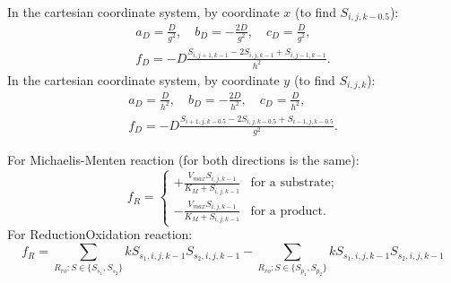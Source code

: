 \documentclass[a4paper,10pt]{article}
\begin{document}
In the cartesian coordinate system, by coordinate $x$ (to find $S_{i,j,k-0.5}$):
\begin{multline}
    a_D = \frac{D}{g^2},\quad
    b_D = -\frac{2 D}{g^2},\quad
    c_D = \frac{D}{g^2},\\
    f_D = - D \frac{S_{i,j+1,k-1} - 2 S_{i,j,k-1} + S_{i,j-1,k-1}}{h^2}.
\end{multline}
In the cartesian coordinate system, by coordinate $y$ (to find $S_{i,j,k}$):
\begin{multline}
    a_D = \frac{D}{h^2},\quad
    b_D = -\frac{2 D}{h^2},\quad
    c_D = \frac{D}{h^2},\\
    f_D = - D \frac{S_{i+1,j,k-0.5} - 2 S_{i,j,k-0.5} + S_{i-1,j,k-0.5}}{g^2}.
\end{multline}

For Michaelis-Menten reaction (for both directions is the same):
\begin{equation}
    f_R =
        \begin{cases}
            +\frac{V_{max} S_{i,j,k-1}}{K_M + S_{i,j,k-1}} &\text{for a substrate};\\
            -\frac{V_{max} S_{i,j,k-1}}{K_M + S_{i,j,k-1}} &\text{for a product}.
        \end{cases}
\end{equation}
For ReductionOxidation reaction:
\begin{equation}
    f_R =
         \sum_{R_{ro} : S \in \{S_{s_1}, S_{s_2}\}} k S_{s_1,i,j,k-1} S_{s_2,i,j,k-1}
        -\sum_{R_{ro} : S \in \{S_{p_1}, S_{p_2}\}} k S_{s_1,i,j,k-1} S_{s_2,i,j,k-1}
\end{equation}
\end{document}
